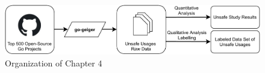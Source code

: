 \begin{figure}[htp!]
    \includegraphics[width=\textwidth]{assets/figures/chapter4/outline4.pdf}
    \caption{Organization of Chapter 4}
    \label{fig:outline4}
\end{figure}
